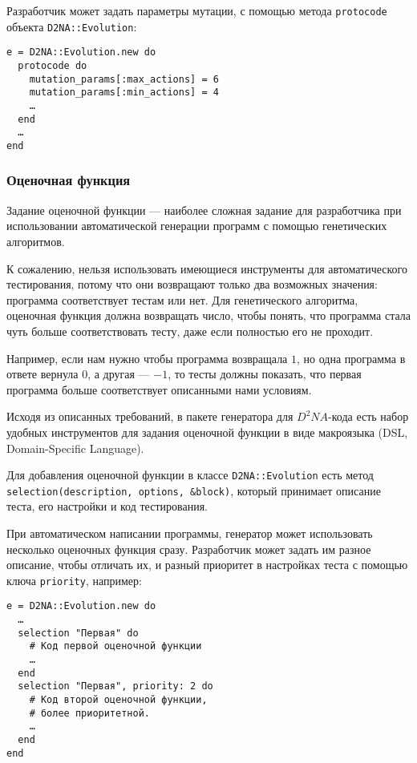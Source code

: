 \documentclass[utf8,a5paper,portrait,10pt,twoside]{eskdtext}
\begin{document}
Разработчик может задать параметры мутации, с помощью метода \texttt{protocode}
объекта \texttt{D2NA::Evolution}:

\begin{verbatim}
e = D2NA::Evolution.new do
  protocode do
    mutation_params[:max_actions] = 6
    mutation_params[:min_actions] = 4
    …
  end
  …
end
\end{verbatim}

\subsubsection{Оценочная функция}

Задание оценочной функции — наиболее сложная задание для разработчика при
использовании автоматической генерации программ с помощью генетических
алгоритмов.

К сожалению, нельзя использовать имеющиеся инструменты для автоматического
тестирования, потому что они возвращают только два возможных значения: программа
соответствует тестам или нет. Для генетического алгоритма, оценочная функция
должна возвращать число, чтобы понять, что программа стала чуть больше 
соответствовать тесту, даже если полностью его не проходит.

Например, если нам нужно чтобы программа возвращала $1$, но одна программа в
ответе вернула $0$, а другая — $-1$, то тесты должны показать, что первая
программа больше соответствует описанными нами условиям.

Исходя из описанных требований, в пакете генератора для $D^2NA$-кода есть набор
удобных инструментов для задания оценочной функции в виде макроязыка (DSL,
Domain-Specific Language).

Для добавления оценочной функции в классе \texttt{D2NA::Evolution} есть метод
\texttt{selection(description, options, \&block)}, который принимает описание
теста, его настройки и код тестирования.

При автоматическом написании программы, генератор может использовать несколько
оценочных функция сразу. Разработчик может задать им разное описание, чтобы
отличать их, и разный приоритет в настройках теста с помощью ключа
\texttt{priority}, например:

\begin{verbatim}
e = D2NA::Evolution.new do
  …
  selection "Первая" do
    # Код первой оценочной функции
    …
  end
  selection "Первая", priority: 2 do
    # Код второй оценочной функции,
    # более приоритетной.
    …
  end
end
\end{verbatim}
\end{document}
